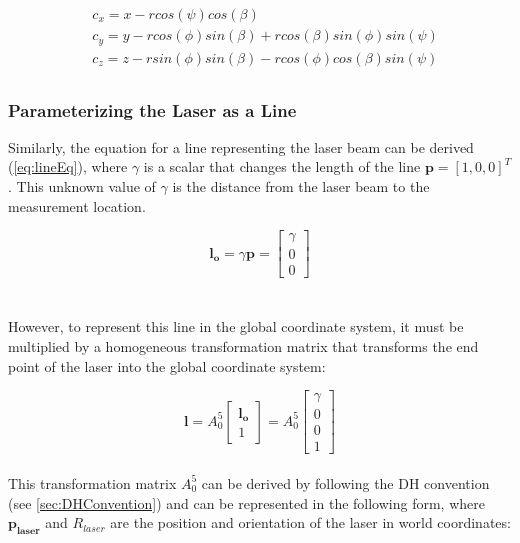 \documentclass[12pt]{article}
\begin{document}
\begin{equation}
  \begin{split}
          & c_x = x - rcos(\psi)cos(\beta) \\
          & c_y = y - rcos(\phi)sin(\beta) + rcos(\beta)sin(\phi)sin(\psi) \\
          & c_z = z - rsin(\phi)sin(\beta) - rcos(\phi)cos(\beta)sin(\psi) \\  
  \label{eq:circleEq5}
  \end{split}
\end{equation}

\subsubsection{Parameterizing the Laser as a Line}

Similarly, the equation for a line representing the laser beam can be derived (\ref{eq:lineEq}), where $\gamma$ is a scalar that changes the length of the line $\mathbf{p} = [1, 0, 0]^T$. This unknown value of $\gamma$ is the distance from the laser beam to the measurement location.

\begin{equation}
	\mathbf{l_o}= \gamma \mathbf{p} =     \begin{bmatrix}
       \gamma \\ 0  \\ 0
    \end{bmatrix}
    \label{eq:lineEq}
\end{equation}
\\
\\
However, to represent this line in the global coordinate system, it must be multiplied by a homogeneous transformation matrix that transforms the end point of the laser into the global coordinate system:

\begin{equation}
	\mathbf{l} = A_0^5 
     \begin{bmatrix}
       \mathbf{l_o} \\ 1
    \end{bmatrix}
     =A_0^5
    \begin{bmatrix}
       \gamma \\ 0  \\ 0 \\ 1
    \end{bmatrix}
    \label{eq:lineEq2}
\end{equation}
\\
This transformation matrix $A_0^5$ can be derived by following the DH convention (see \ref{sec:DHConvention}) and can be represented in the following form, where $\mathbf{p_{laser}}$ and $R_{laser}$ are the position and orientation of the laser in world coordinates: 
\end{document}
